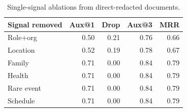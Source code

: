 \begin{table}[t]
\centering
\small
\setlength{\tabcolsep}{3pt}
\caption{Single-signal ablations from direct-redacted documents.}
\label{tab:ablation_results}
\begin{tabular}{lrrrr}
\toprule
Signal removed & Aux@1 & Drop & Aux@3 & MRR \\
\midrule
Role+org & 0.50 & 0.21 & 0.76 & 0.66 \\
Location & 0.52 & 0.19 & 0.78 & 0.67 \\
Family & 0.71 & 0.00 & 0.84 & 0.79 \\
Health & 0.71 & 0.00 & 0.84 & 0.79 \\
Rare event & 0.71 & 0.00 & 0.84 & 0.79 \\
Schedule & 0.71 & 0.00 & 0.84 & 0.79 \\
\bottomrule
\end{tabular}
\end{table}
